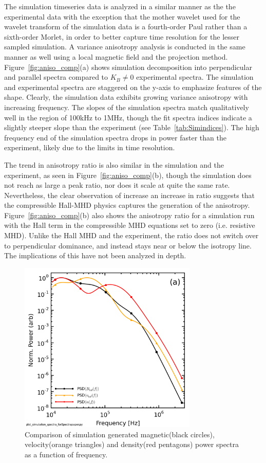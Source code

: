 \documentclass[aip,prl,amsmath,amssymb,reprint,superscriptaddress]{revtex4-1} %
\begin{document}
The simulation timeseries data is analyzed in a similar manner as the the experimental data with the exception that the mother wavelet used for the wavelet transform of the simulation data is a fourth-order Paul rather than a sixth-order Morlet, in order to better capture time resolution for the lesser sampled simulation. A variance anisotropy analysis is conducted in the same manner as well using a local magnetic field and the projection method. Figure~\ref{fig:aniso_comp}(a) shows simulation decomposition into perpendicular and parallel spectra compared to $K_{B}\neq 0$ experimental spectra. The simulation and experimental spectra are staggered on the y-axis to emphasize features of the shape. Clearly, the simulation data exhibits growing variance anisotropy with increasing frequency. The slopes of the simulation spectra match qualitatively well in the region of 100kHz to 1MHz, though the fit spectra indices indicate a slightly steeper slope than the experiment (see Table~\ref{tab:Simindices}). The high frequency end of the simulation spectra drops in power faster than the experiment, likely due to the limits in time resolution.

The trend in anisotropy ratio is also similar in the simulation and the experiment, as seen in Figure~\ref{fig:aniso_comp}(b), though the simulation does not reach as large a peak ratio, nor does it scale at quite the same rate. Nevertheless, the clear observation of increase an increase in ratio suggests that the compressible Hall-MHD physics captures the generation of the anisotropy. Figure~\ref{fig:aniso_comp}(b) also shows the anisotropy ratio for a simulation run with the Hall term in the compressible MHD equations set to zero (i.e. resistive MHD). Unlike the Hall MHD and the experiment, the ratio does not switch over to perpendicular dominance, and instead stays near or below the isotropy line. The implications of this have not been analyzed in depth.

\begin{figure}[!htbp]
\centerline{
\includegraphics[width=8.5cm]{BfieldFlow_simulation_comparison}}
\caption{\label{fig:bflow_comp} Comparison of simulation generated magnetic(black circles), velocity(orange triangles) and density(red pentagons) power spectra as a function of frequency.}
\end{figure}
\end{document}
